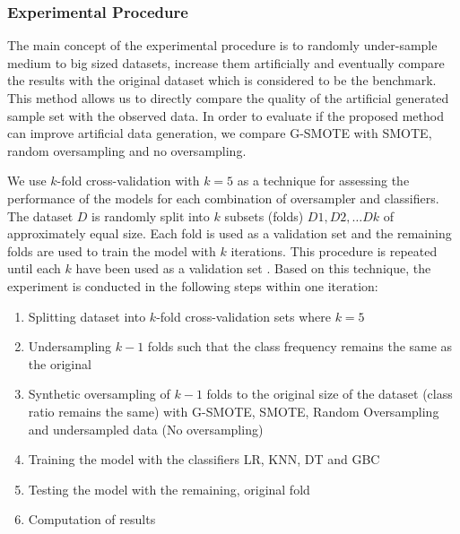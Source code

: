 \documentclass[parskip=full]{scrartcl}
\begin{document}
\subsubsection{Experimental Procedure}

The main concept of the experimental procedure is to randomly under-sample medium to big sized datasets, increase them artificially and eventually compare the results with the original dataset which is considered to be the benchmark. This method allows us to directly compare the quality of the artificial generated sample set with the observed data. In order to evaluate if the proposed method can improve artificial data generation, we compare G-SMOTE with SMOTE, random oversampling and no oversampling. 

We use $\mathit{k}$-fold cross-validation with $\mathit{k = 5}$ as a technique for assessing the performance of the models for each combination of oversampler and classifiers. The dataset $\mathit{D}$ is randomly split into $\mathit{k}$ subsets (folds) $\mathit{D1, D2, … Dk}$ of approximately equal size. Each fold is used as a validation set and the remaining folds are used to train the model with $\mathit{k}$ iterations. This procedure is repeated until each $\mathit{k}$ have been used as a validation set \cite{Han.2012}. Based on this technique, the experiment is conducted in the following steps within one iteration:

\begin{enumerate}
	\item 
	Splitting dataset into $\mathit{k}$-fold cross-validation sets where $\mathit{k = 5}$
	\item 
	Undersampling $\mathit{k - 1}$ folds such that the class frequency remains the same as the original
	\item 
	Synthetic oversampling of $\mathit{k - 1}$ folds to the original size of the dataset (class ratio remains the same) with G-SMOTE, SMOTE, Random Oversampling and undersampled data (No oversampling)
	\item 
	Training the model with the classifiers LR, KNN, DT and GBC
	\item 
	Testing the model with the remaining, original fold
	\item 
	Computation of results
\end{enumerate}	
\end{document}
